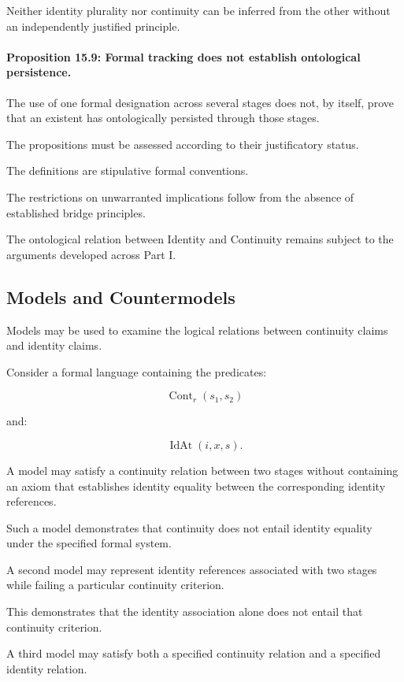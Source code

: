 Neither identity plurality
nor continuity can
be inferred from the
other without an
independently justified
principle.

\paragraph{Proposition 15.9: Formal tracking does not establish ontological persistence.}

The use of one formal
designation across
several stages does
not, by itself, prove
that an existent has
ontologically persisted
through those stages.

The propositions must
be assessed according
to their justificatory
status.

The definitions are
stipulative formal
conventions.

The restrictions on
unwarranted implications
follow from the absence
of established bridge
principles.

The ontological relation
between Identity and
Continuity remains
subject to the arguments
developed across Part I.

\subsection{Models and Countermodels}

Models may be used
to examine the logical
relations between
continuity claims and
identity claims.

Consider a formal
language containing
the predicates:

\[
    \operatorname{Cont}_{r}(s_1,s_2)
\]

and:

\[
    \operatorname{IdAt}(i,x,s).
\]

A model may satisfy
a continuity relation
between two stages
without containing
an axiom that establishes
identity equality between
the corresponding
identity references.

Such a model demonstrates
that continuity does
not entail identity
equality under the
specified formal system.

A second model may
represent identity
references associated
with two stages while
failing a particular
continuity criterion.

This demonstrates
that the identity
association alone
does not entail that
continuity criterion.

A third model may
satisfy both a specified
continuity relation
and a specified identity
relation.

